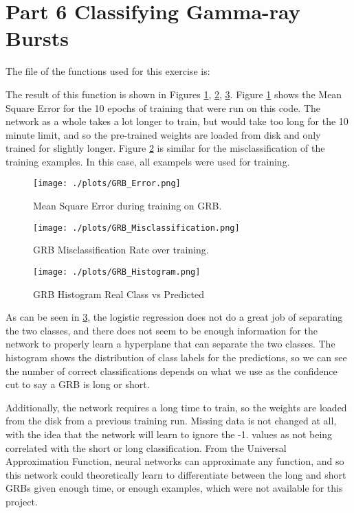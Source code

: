 \section{Part 6 Classifying Gamma-ray Bursts}

The file of the functions used for this exercise is:



The result of this function is shown in Figures \ref{fig:mse}, \ref{fig:misclassify}, \ref{fig:predction}.
Figure \ref{fig:mse} shows the Mean Square Error for the 10 epochs of training that were run on this code. The network as a whole
takes a lot longer to train, but would take too long for the 10 minute limit, and so the pre-trained weights are loaded from disk and
only trained for slightly longer. Figure \ref{fig:misclassify} is similar for the misclassification of the training examples. In this case,
all exampels were used for training.

\begin{figure}[h!]
  \centering
  \texttt{[image: ./plots/GRB\_Error.png]}
  \caption{Mean Square Error during training on GRB.}
  \label{fig:mse}
\end{figure}

\begin{figure}[h!]
  \centering
  \texttt{[image: ./plots/GRB\_Misclassification.png]}
  \caption{GRB Misclassification Rate over training.}
  \label{fig:misclassify}
\end{figure}

\begin{figure}[h!]
  \centering
  \texttt{[image: ./plots/GRB\_Histogram.png]}
  \caption{GRB Histogram Real Class vs Predicted}
  \label{fig:predction}
\end{figure}

As can be seen in \ref{fig:predction}, the logistic regression does not do a great
job of separating the two classes, and there does not seem to be enough
information for the network to properly learn a hyperplane that can
separate the two classes. The histogram shows the distribution of class labels for the
predictions, so we can see the number of correct classifications depends on what we use as the
confidence cut to say a GRB is long or short.

Additionally, the network requires a long time to train, so the
weights are loaded from the disk from a previous training run. Missing data is not
changed at all, with the idea that the network will learn to ignore the -1. values as not
being correlated with the short or long classification. From the Universal Approximation Function,
neural networks can approximate any function, and so this network could theoretically learn to differentiate between
the long and short GRBs given enough time, or enough examples, which were not available for this project.


